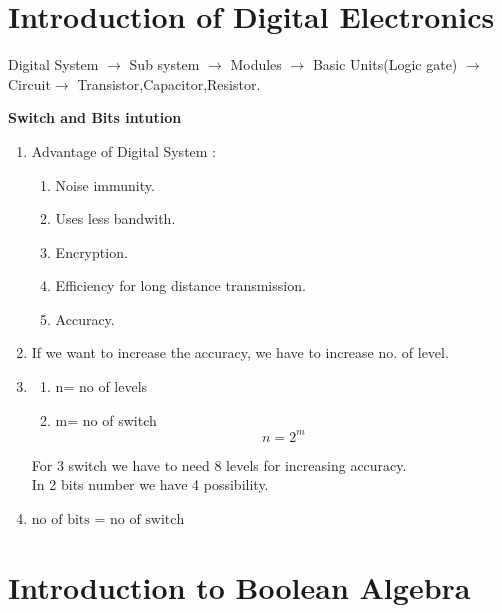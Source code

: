 \documentclass[a4aper,12pt]{report}
\begin{document}
\section{Introduction of Digital Electronics}

\vspace{1em}



{\large Digital System $\longrightarrow$ Sub system $\longrightarrow$ Modules $\longrightarrow$ Basic Units(Logic gate) $\longrightarrow$ Circuit$\longrightarrow$ Transistor,Capacitor,Resistor.}
\vspace{1em}

\par \textbf{\large Switch and Bits intution }

\begin{enumerate}
    \item [$\blacksquare$] Advantage of Digital System : 
    \begin{enumerate}
        \item[(i)] Noise immunity.
        \item[(ii)] Uses less bandwith.
        \item [(iii)] Encryption.
        \item [(iv)] Efficiency for long distance transmission.
        \item [(v)] Accuracy.
    \end{enumerate}
    \item[*] If we want to increase the accuracy, we have to increase no. of level.
    \item [*] 
    \begin{enumerate}
        \item []n= no of levels
        \item []m= no of switch  
        $$\boxed{n=2^m}$$
    \end{enumerate}
    For 3 switch we have to need 8 levels for increasing accuracy.
    \\ In 2 bits number we have 4 possibility.
  
    
    \item[***]$\boxed{\text{no of bits = no of switch}}$ 
\end{enumerate}
\section{Introduction to Boolean Algebra}
\end{document}
